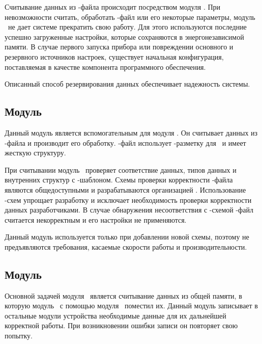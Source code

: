 
Считывание данных из \cid-файла происходит посредством модуля \moduleXml. При невозможности считать, обработать \cid-файл или его некоторые параметры, модуль \moduleCfg\ не дает системе прекратить свою работу. Для этого используются последние успешно загруженные настройки, которые сохраняются в энергонезависимой памяти. В случае первого запуска прибора или повреждении основного и резервного источников настроек, существует начальная конфигурация, поставляемая в качестве компонента программного обеспечения.

Описанный способ резервирования данных обеспечивает надежность системы.

\subsection{Модуль \moduleXml}

Данный модуль является вспомогательным для модуля \moduleCfg. Он считывает данных из \cid-файла и производит его обработку. \cid-файл использует \xml-разметку для \moduleDataStoring\ и имеет жесткую структуру.


При считывании модуль \moduleXml\ проверяет соответствие данных, типов данных и внутренних структур с \xsd-шаблоном. Схемы проверки корректности \cid-файла являются общедоступными и разрабатываются организацией \iec. Использование \xsd-схем упрощает разработку и исключает необходимость проверки корректности данных разработчиками.
В случае обнаружения несоответствия с \xsd-схемой \cid-файл считается некорректным и его настройки не применяются.

Данный модуль используется только при добавлении новой схемы, поэтому не предъявляются требования, касаемые скорости работы и производительности.

\subsection{Модуль \moduleSettingsApply}

Основной задачей модуля \moduleSettingsApply\ является считывание данных из общей памяти, в которую модуль \moduleCfg\ с помощью модуля \moduleXml\ поместил их. Данный модуль записывает в остальные модули устройства необходимые данные для их дальнейшей корректной работы. При возникновении ошибки записи он повторяет свою попытку.

